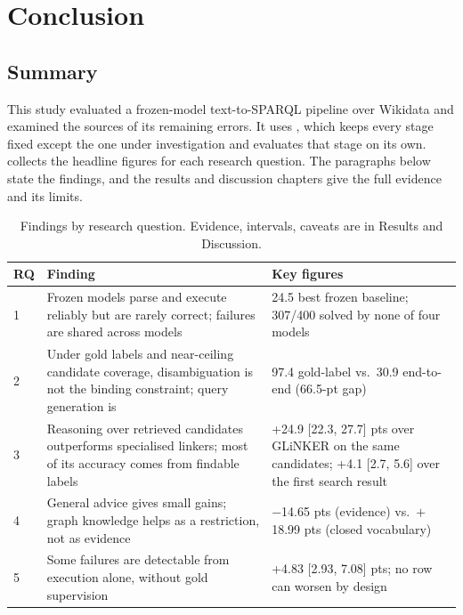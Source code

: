\chapter{Conclusion}

\label{ch:conclusion}

\section{Summary}

\label{sec:conclusion-summary}

This study evaluated a frozen-model text-to-SPARQL pipeline over Wikidata and examined the sources of its remaining errors.
It uses \method{}, which keeps every stage fixed except the one under investigation and evaluates that stage on its own.
 collects the headline figures for each research question.
The paragraphs below state the findings, and the results and discussion chapters give the full evidence and its limits.

\begin{table}[htbp]
\centering
\small
\caption{Findings by research question. Evidence, intervals, caveats are in Results and Discussion.}
\label{tab:conclusion-summary}
\begin{tabular}{@{}p{0.9cm}p{7.6cm}p{4.4cm}@{}}
\toprule
RQ & Finding & Key figures \\
\midrule
1 & Frozen models parse and execute reliably but are rarely correct; failures are shared across models & 24.5 best frozen baseline; 307/400 solved by none of four models \\
2 & Under gold labels and near-ceiling candidate coverage, disambiguation is not the binding constraint; query generation is & 97.4 gold-label vs.\ 30.9 end-to-end (66.5-pt gap) \\
3 & Reasoning over retrieved candidates outperforms specialised linkers; most of its accuracy comes from findable labels & +24.9 [22.3, 27.7] pts over GLiNKER on the same candidates; +4.1 [2.7, 5.6] over the first search result \\
4 & General advice gives small gains; graph knowledge helps as a restriction, not as evidence & $-$14.65 pts (evidence) vs.\ $+$18.99 pts (closed vocabulary) \\
5 & Some failures are detectable from execution alone, without gold supervision & +4.83 [2.93, 7.08] pts; no row can worsen by design \\
\bottomrule
\end{tabular}
\end{table}

